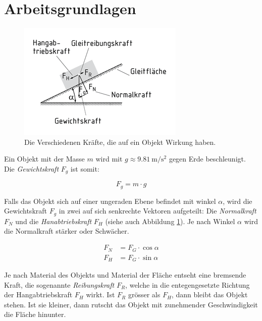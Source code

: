 \section{Arbeitsgrundlagen}

\begin{figure}[H]
    \centering
    \includegraphics[width=.7\linewidth]{images/gleitreibung_hang}
    \caption{Die Verschiedenen Kr\"afte, die auf ein Objekt Wirkung haben.}
    \label{fig:objekt}
\end{figure}

Ein       Objekt       mit       der       Masse       $m$        wird       mit
$g\approx\SI{9.81}{\meter\per\second\squared}$  gegen   Erde  beschleunigt.  Die
\textit{Gewichtskraft} $F_g$ ist somit:

\begin{equation}
    F_g = m \cdot g
\end{equation}

Falls das Objekt sich  auf  einer  ungeraden Ebene befindet mit winkel $\alpha$,
wird  die Gewichtskraft $F_g$ in zwei auf sich senkrechte  Vektoren  aufgeteilt:
Die \textit{Normalkraft} $F_N$ und  die  \textit{Hanabtriebskraft}  $F_H$ (siehe
auch  Abbildung \ref{fig:objekt}). Je nach Winkel $\alpha$ wird die  Normalkraft
st\"arker oder Schw\"acher.

\begin{align}
    F_N &= F_G\cdot\cos\alpha \\
    F_H &= F_G\cdot\sin\alpha
\end{align}

Je nach Material des  Objekts  und  Material der Fl\"ache entseht eine bremsende
Kraft,   die   sogenannte   \textit{Reibungskraft}   $F_R$,   welche   in    die
entegengesetzte Richtung der Hangabtriebskraft $F_H$ wirkt.  Ist $F_R$ gr\"osser
als $F_H$, dann bleibt  das  Objekt  stehen.  Ist  sie kleiner, dann rutscht das
Objekt mit zunehmender Geschwindigkeit die Fl\"ache hinunter.

